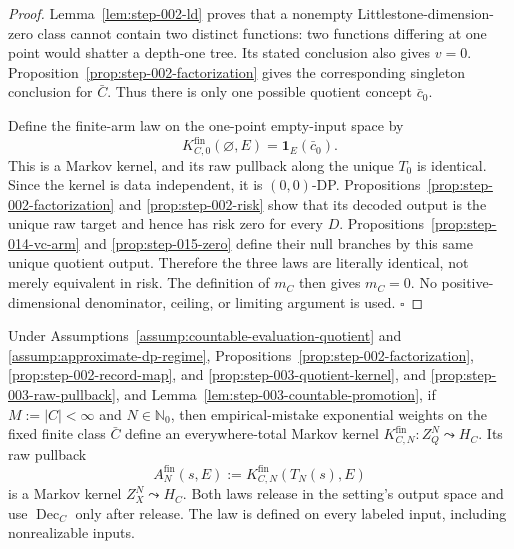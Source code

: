 \begin{proof}
Lemma~\ref{lem:step-002-ld} proves that a nonempty
Littlestone-dimension-zero class cannot contain two distinct functions: two
functions differing at one point would shatter a depth-one tree. Its stated
conclusion also gives \(v=0\). Proposition~\ref{prop:step-002-factorization} gives the corresponding
singleton conclusion for \(\bar C\). Thus there is only one possible quotient
concept \(\bar c_0\).

Define the finite-arm law on the one-point empty-input space by
\[
K^{\mathrm{fin}}_{C,0}(\varnothing,E)=\mathbf 1_E(\bar c_0).
\tag{1.1}
\]
This is a Markov kernel, and its raw pullback along the unique \(T_0\) is
identical. Since the kernel is data independent, it is \((0,0)\)-DP.
 Propositions~\ref{prop:step-002-factorization} and
\ref{prop:step-002-risk} show that its decoded output is the unique raw target
and hence has risk zero for every \(D\). 
Propositions~\ref{prop:step-014-vc-arm} and
\ref{prop:step-015-zero} define their null branches by this same unique
quotient output. Therefore the three laws are literally identical, not merely
equivalent in risk. The definition of \(m_C\) then gives \(m_C=0\). No
positive-dimensional denominator, ceiling, or limiting argument is used.
\(\square\)


\end{proof}

\begin{proposition}\label{prop:step-016-finite-kernel}
Under Assumptions~\ref{assump:countable-evaluation-quotient} and
\ref{assump:approximate-dp-regime}, 
Propositions~\ref{prop:step-002-factorization},
\ref{prop:step-002-record-map}, and
\ref{prop:step-003-quotient-kernel}, and
\ref{prop:step-003-raw-pullback}, and Lemma~\ref{lem:step-003-countable-promotion}, if
\(M:=|C|<\infty\) and \(N\in\mathbb N_0\), then empirical-mistake
exponential weights on the fixed finite class \(\bar C\) define an
everywhere-total Markov kernel
\(K^{\mathrm{fin}}_{C,N}:Z_Q^N\leadsto H_C\). Its raw pullback
\[
A_N^{\mathrm{fin}}(s,E)
:=K^{\mathrm{fin}}_{C,N}(T_N(s),E)
\tag{2.1}
\]
is a Markov kernel \(Z_X^N\leadsto H_C\). Both laws release in the setting's
output space and use \(\operatorname{Dec}_C\) only after release. The law is
defined on every labeled input, including nonrealizable inputs.


\end{proposition}

